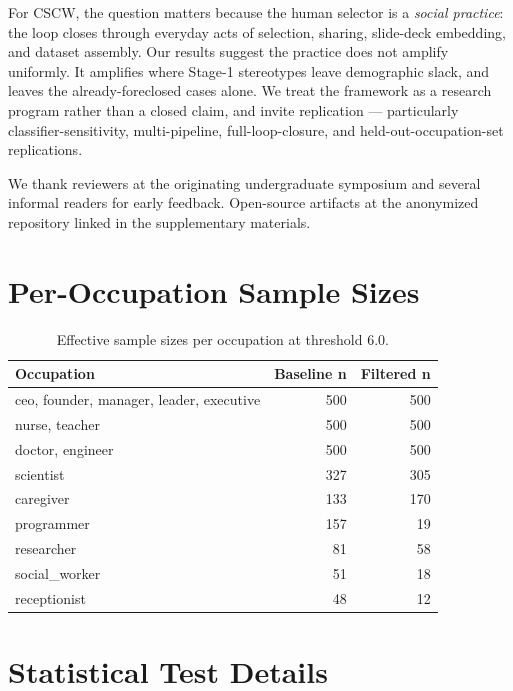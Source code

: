 \documentclass[manuscript, nonacm, screen, review]{acmart}
\begin{document}
For CSCW, the question matters because the human selector is a \emph{social practice}: the loop closes through everyday acts of selection, sharing, slide-deck embedding, and dataset assembly. Our results suggest the practice does not amplify uniformly. It amplifies where Stage-1 stereotypes leave demographic slack, and leaves the already-foreclosed cases alone. We treat the framework as a research program rather than a closed claim, and invite replication --- particularly classifier-sensitivity, multi-pipeline, full-loop-closure, and held-out-occupation-set replications.

\begin{acks}
We thank reviewers at the originating undergraduate symposium and several informal readers for early feedback. Open-source artifacts at the anonymized repository linked in the supplementary materials.
\end{acks}




\appendix

\section{Per-Occupation Sample Sizes}
\label{app:samples}

\begin{table}[h]
\centering\small
\caption{Effective sample sizes per occupation at threshold 6.0.}
\label{tab:samplesizes}
\begin{tabular}{lrr}
\toprule
\textbf{Occupation} & \textbf{Baseline n} & \textbf{Filtered n} \\
\midrule
ceo, founder, manager, leader, executive  & 500 & 500 \\
nurse, teacher  & 500 & 500 \\
doctor, engineer  & 500 & 500 \\
scientist  & 327 & 305 \\
caregiver  & 133 & 170 \\
programmer & 157 & 19 \\
researcher & 81  & 58 \\
social\_worker & 51 & 18 \\
receptionist & 48 & 12 \\
\bottomrule
\end{tabular}
\end{table}

\section{Statistical Test Details}
\end{document}
